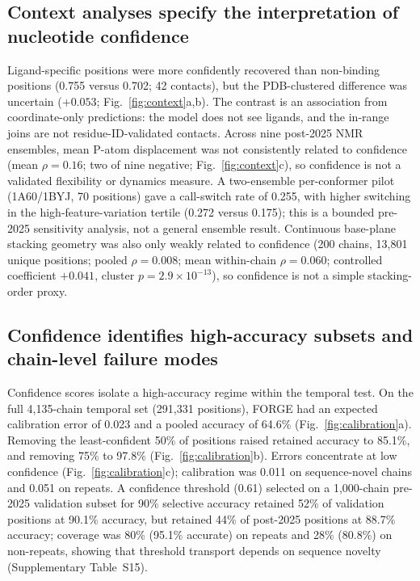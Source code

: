 \subsection{Context analyses specify the interpretation of nucleotide confidence}

Ligand-specific positions were more confidently recovered than non-binding positions
(0.755 versus 0.702; 42 contacts), but the PDB-clustered difference was uncertain
($+0.053$; Fig.~\ref{fig:context}a,b). The contrast is an association from coordinate-only predictions: the model
does not see ligands, and the in-range joins are not residue-ID-validated contacts. Across nine post-2025 NMR ensembles, mean P-atom
displacement was not consistently related to confidence (mean $\rho=0.16$; two of nine
negative; Fig.~\ref{fig:context}c), so confidence is not a validated flexibility or
dynamics measure. A two-ensemble per-conformer pilot (1A60/1BYJ, 70 positions) gave a
call-switch rate of 0.255, with higher switching in the high-feature-variation tertile
(0.272 versus 0.175); this is a bounded pre-2025 sensitivity analysis, not a general
ensemble result. Continuous base-plane stacking geometry was also only weakly related to
confidence (200 chains, 13,801 unique positions; pooled $\rho=0.008$; mean within-chain
$\rho=0.060$; controlled coefficient $+0.041$, cluster
$p=2.9\times10^{-13}$), so confidence is not a simple stacking-order proxy.

\subsection{Confidence identifies high-accuracy subsets and chain-level failure modes}

Confidence scores isolate a high-accuracy regime within the temporal test. On the full 4,135-chain
temporal set (291,331 positions), FORGE had an expected calibration error of 0.023 and a pooled accuracy of 64.6\% (Fig.~\ref{fig:calibration}a).
Removing the least-confident 50\% of positions raised retained accuracy to 85.1\%, and
removing 75\% to 97.8\% (Fig.~\ref{fig:calibration}b). Errors concentrate at low confidence (Fig.~\ref{fig:calibration}c); calibration was 0.011 on
sequence-novel chains and 0.051 on repeats. A confidence threshold (0.61) selected on a 1,000-chain pre-2025
validation subset for 90\% selective accuracy retained 52\% of validation positions at
90.1\% accuracy, but retained 44\% of post-2025 positions at 88.7\% accuracy; coverage was 80\% (95.1\% accurate) on
repeats and 28\% (80.8\%) on non-repeats, showing that threshold transport depends on sequence novelty (Supplementary Table~S15).

